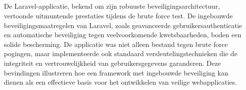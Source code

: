 \subsection{}
De Laravel-applicatie, bekend om zijn robuuste beveiligingsarchitectuur, vertoonde uitmuntende prestaties tijdens de brute force test. De 
ingebouwde beveiligingsmaatregelen van Laravel, zoals geavanceerde gebruikersauthenticatie en automatische beveiliging tegen veelvoorkomende 
kwetsbaarheden, boden een solide bescherming. De applicatie was niet alleen bestand tegen brute force pogingen, maar implementeerde ook 
standaard versleutelingstechnieken die de integriteit en vertrouwelijkheid van gebruikersgegevens garanderen. Deze bevindingen illustreren 
hoe een framework met ingebouwde beveiliging kan dienen als een effectieve basis voor het ontwikkelen van veilige webapplicaties.
